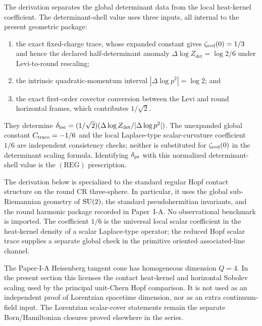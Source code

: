 \documentclass[12pt,a4paper]{article}
\begin{document}
The derivation separates the global determinant data from the local
heat-kernel coefficient.  The determinant-shell value uses three inputs, all
internal to the present geometric package:

\begin{enumerate}
\item the exact fixed-charge trace, whose expanded constant gives
      \(\zeta_{\rm red}(0)=1/3\) and hence the declared half-determinant anomaly
      \(\Delta\log Z_{\det}=\log2/6\) under Levi-to-round rescaling;
\item the intrinsic quadratic-momentum interval
      \(|\Delta\log p^2|=\log2\); and
\item the exact first-order covector conversion between the Levi and round
      horizontal frames, which contributes \(1/\sqrt2\).
\end{enumerate}
They determine
\(\delta_{\rm loc}=(1/\sqrt2)(\Delta\log Z_{\det}/|\Delta\log p^2|)\).
The unexpanded global constant \(C_{\rm trace}=-1/6\) and the local
Laplace-type scalar-curvature coefficient \(1/6\) are independent consistency
checks; neither is substituted for \(\zeta_{\rm red}(0)\) in the determinant
scaling formula.  Identifying \(\delta_{\rm pr}\) with this normalized
determinant-shell value is the \((\mathrm{REG})\) prescription.

\begin{remark}
The derivation below is specialized to the standard regular Hopf contact structure on the round CR three-sphere.  In particular, it uses the global sub-Riemannian geometry of $\mathrm{SU}(2)$, the standard pseudohermitian invariants, and the round harmonic package recorded in Paper~I-A.  No observational benchmark is imported.  The coefficient $1/6$ is the universal local scalar coefficient in the heat-kernel density of a scalar Laplace-type operator; the reduced Hopf scalar trace supplies a separate global check in the primitive oriented associated-line channel.
\end{remark}


\begin{remark}[Contact \(Q=4\) is an analytic scaling datum]
\label{p3:rem:contact-q4-not-spacetime-dimension}
The Paper-I-A Heisenberg tangent cone has homogeneous dimension \(Q=4\).  In the
present section this licenses the contact heat-kernel and horizontal Sobolev
scaling used by the principal unit-Chern Hopf comparison.  It is not used as an independent
proof of Lorentzian spacetime dimension, nor as an extra continuum-field input.
The Lorentzian scalar-cover statements remain the separate Born/Hamiltonian
closures proved elsewhere in the series.
\end{remark}
\end{document}
